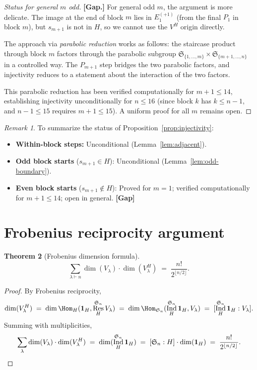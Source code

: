 \documentclass[11pt]{article}
\newtheorem{theorem}{Theorem}[section]
\theoremstyle{definition}
\theoremstyle{remark}
\newtheorem{remark}[theorem]{Remark}
\newcommand{\Sym}{\mathfrak{S}}
\DeclareMathOperator{\Ind}{Ind}
\DeclareMathOperator{\Res}{Res}
\begin{document}
\begin{proof}[Status for general $m$ odd]
\textbf{[Gap.]} For general odd $m$, the argument is more delicate.
The image at the end of block $m$ lies in $E_1^{(+1)}$ (from the
final $P_1$ in block $m$), but $s_{m+1}$ is not in $H$, so we
cannot use the $V^H$ origin directly.

The approach via \emph{parabolic reduction} works as follows:
the staircase product through block $m$ factors through the
parabolic subgroup $\Sym_{\{1,\ldots,m\}} \times \Sym_{\{m+1,\ldots,n\}}$
in a controlled way. The $P_{m+1}$ step bridges the two parabolic
factors, and injectivity reduces to a statement about
the interaction of the two factors.

This parabolic reduction has been verified computationally
for $m+1 \le 14$, establishing injectivity unconditionally
for $n \le 16$ (since block $k$ has $k \le n-1$, and
$n - 1 \le 15$ requires $m + 1 \le 15$). A uniform proof
for all $m$ remains open.
\end{proof}

\begin{remark}
To summarize the status of Proposition~\ref{prop:injectivity}:
\begin{itemize}
\item \textbf{Within-block steps:} Unconditional (Lemma~\ref{lem:adjacent}).
\item \textbf{Odd block starts} ($s_{m+1} \in H$):
  Unconditional (Lemma~\ref{lem:odd-boundary}).
\item \textbf{Even block starts} ($s_{m+1} \notin H$):
  Proved for $m = 1$; verified computationally for $m+1 \le 14$;
  open in general. \textbf{[Gap]}
\end{itemize}
\end{remark}


\section{Frobenius reciprocity argument}\label{sec:frobenius}

\begin{theorem}[Frobenius dimension formula]\label{thm:frobenius}
\[
  \sum_{\lambda \vdash n} \dim(V_\lambda) \cdot \dim(V_\lambda^H)
  \;=\; \frac{n!}{2^{\lfloor n/2 \rfloor}}.
\]
\end{theorem}

\begin{proof}
By Frobenius reciprocity,
\[
  \dim(V_\lambda^H)
  \;=\; \dim\Hom_H(\mathbf{1}_H, \Res_H^{\Sym_n} V_\lambda)
  \;=\; \dim\Hom_{\Sym_n}(\Ind_H^{\Sym_n} \mathbf{1}_H, V_\lambda)
  \;=\; [\Ind_H^{\Sym_n} \mathbf{1}_H : V_\lambda].
\]
Summing with multiplicities,
\[
  \sum_\lambda \dim(V_\lambda) \cdot \dim(V_\lambda^H)
  \;=\; \dim(\Ind_H^{\Sym_n} \mathbf{1}_H)
  \;=\; [\Sym_n : H] \cdot \dim(\mathbf{1}_H)
  \;=\; \frac{n!}{2^{\lfloor n/2 \rfloor}}.
  \qedhere
\]
\end{proof}
\end{document}
